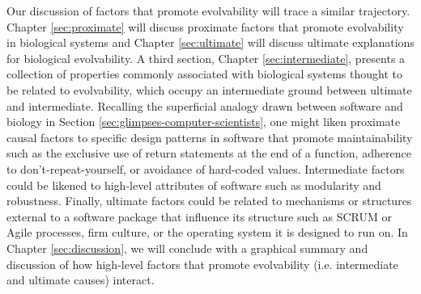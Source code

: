 Our discussion of factors that promote evolvability will trace a similar trajectory. Chapter \ref{sec:proximate} will discuss proximate factors that promote evolvability in biological systems and Chapter \ref{sec:ultimate} will discuss ultimate explanations for biological evolvability. A third section, Chapter \ref{sec:intermediate}, presents a collection of properties commonly associated with biological systems thought to be related to evolvability, which occupy an intermediate ground between ultimate and intermediate. Recalling the superficial analogy drawn between software and biology in Section \ref{sec:glimpses-computer-scientists}, one might liken proximate causal factors to specific design patterns in software that promote maintainability such as the exclusive use of return statements at the end of a function, adherence to don't-repeat-yourself, or avoidance of hard-coded values. Intermediate factors could be likened to high-level attributes of software such as modularity and robustness. Finally, ultimate factors could be related to mechanisms or structures external to a software package that influence its structure such as SCRUM or Agile processes, firm culture, or the operating system it is designed to run on. In Chapter \ref{sec:discussion}, we will conclude with a graphical summary and discussion of how high-level factors that promote evolvability (i.e. intermediate and ultimate causes) interact.

